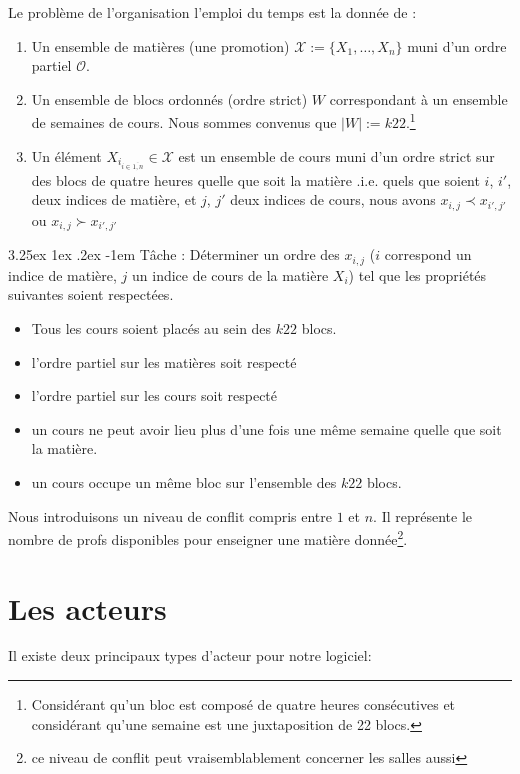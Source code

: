 \documentclass[12pt,a4paper,french]{article}
\makeatletter
\renewcommand\paragraph{\@startsection{paragraph}{5}{\z@}%
  {3.25ex \@plus1ex \@minus.2ex}%
  {-1em}%
  {\normalfont\normalsize\bfseries}}
\makeatother
\begin{document}
Le problème de l'organisation l'emploi du temps est la donnée de : 
\begin{enumerate}
\item Un ensemble de matières (une promotion) $\mathcal{X}:=\{X_{1},\dots, X_{n}\}$ muni d'un ordre partiel $\mathcal{O}$. \item Un ensemble de blocs ordonnés (ordre strict) $W$ correspondant à un ensemble de semaines de cours. Nous sommes convenus que $|W|:=k22$.\footnote{Considérant qu'un bloc est composé de quatre heures consécutives et considérant qu'une semaine est une juxtaposition de 22 blocs.}
\item Un élément $X_{i_{i\in\overline{1,n}}}\in\mathcal{X}$ est un ensemble de cours muni d'un ordre strict sur des blocs de quatre heures quelle que soit la matière .i.e. quels que soient $i$, $i'$, deux indices de matière, et $j$, $j'$ deux indices de cours, nous avons $x_{i,j} \prec x_{i',j'}$ ou $x_{i,j} \succ x_{i',j'}$


\end{enumerate} 

\paragraph{Tâche : } Déterminer un ordre des $x_{i,j}$ ($i$ correspond un indice de matière, $j$ un indice de cours de la matière $X_{i}$) tel que les propriétés suivantes soient respectées.
\begin{itemize}
\item Tous les cours soient placés au sein des $k22$ blocs.
\item l'ordre partiel sur les matières soit respecté
\item l'ordre partiel sur les cours soit respecté
\item un cours ne peut avoir lieu plus d'une fois une même semaine quelle que soit la matière.
\item un cours occupe un même bloc sur l'ensemble des $k22$ blocs.
\end{itemize}   

Nous introduisons un niveau de conflit compris entre $1$ et $n$. Il représente le nombre de profs disponibles pour enseigner une matière donnée\footnote{ce niveau de conflit peut vraisemblablement concerner les salles aussi}.

\newpage
\section{Les acteurs}        
Il existe deux principaux types d'acteur pour notre logiciel:
\end{document}
